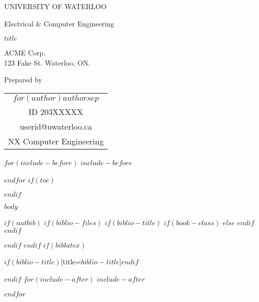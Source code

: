 \documentclass[$if(fontsize)$$fontsize$,$endif$$if(lang)$$lang$,$endif$]{$documentclass$}
\date{$date$}
\makeatletter
\renewcommand{\maketitle}{%
  \begin{titlepage}
  \begin{singlespacing}
  \let\footnotesize\small
  \let\footnoterule\relax
  \let\footnote\thanks
  \begin{center}
    {\large \MakeTextUppercase{University of Waterloo} \par Electrical \& Computer Engineering}%
  \end{center}
  \null\vfill
  \begin{center}
      {\LARGE  \par}{\huge \MakeTextUppercase{$title$} \par}%
  \end{center}\par
  \null\vfill
  \begin{center}
    {\large ACME Corp.\\ 123 Fake St. Waterloo, ON.}
  \end{center}\par
  \null\vfill
  \begin{center}
    \large Prepared by\\
      \begin{tabular}[t]{c}
        $for(author)$$author$$sep$ \and $endfor$ \\
          ID 203XXXXX \\ userid@uwaterloo.ca\\ NX Computer Engineering
      \end{tabular}
      \par
    \date{$date$}
  \end{center}
  \end{singlespacing}
  \end{titlepage}
}
\makeatother
\begin{document}
\maketitle
\thispagestyle{empty}

\setcounter{page}{1}

$for(include-before)$
$include-before$

$endfor$
$if(toc)$
{

\clearpage
\hypersetup{linkcolor=black}

\begin{singlespacing}{%
\setlength{\parskip}{0pt}

\tableofcontents

\clearpage
\listoffigures
{}
\pagebreak

\clearpage
\listoftables
{}
\pagebreak
}
\end{singlespacing}

}
$endif$

\setcounter{page}{1}
$body$


$if(natbib)$
$if(biblio-files)$
$if(biblio-title)$
$if(book-class)$
\renewcommand\bibname{$biblio-title$}
$else$
\renewcommand\refname{$biblio-title$}
$endif$
$endif$

$endif$
$endif$
$if(biblatex)$

\begin{singlespacing}
\clearpage
\hypersetup{linkcolor=black}
\printbibliography$if(biblio-title)$[title=$biblio-title$]$endif$
\end{singlespacing}

$endif$
$for(include-after)$
$include-after$

$endfor$
\end{document}

